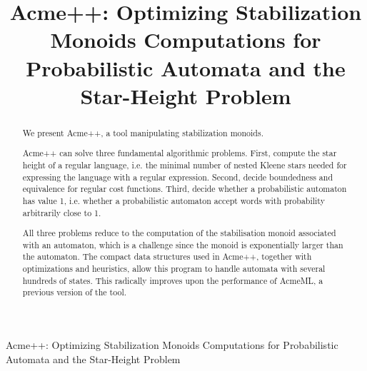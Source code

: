 \documentclass[11pt]{llncs}
\title{Acme++: Optimizing Stabilization Monoids Computations for Probabilistic Automata and the Star-Height Problem}
\begin{document}
\begin{center}
{\large
Acme++: Optimizing Stabilization Monoids Computations for Probabilistic Automata and the Star-Height Problem}
\end{center}

\begin{abstract}
We present Acme++, a tool manipulating stabilization monoids.

Acme++ can solve three fundamental algorithmic problems.  First, compute
the star height of a regular language, i.e. the minimal number of
nested Kleene stars needed for expressing the language with a regular expression. Second, decide boundedness and equivalence for regular cost functions. Third, decide whether a
probabilistic automaton has value 1, i.e. whether a probabilistic
automaton accept words with probability arbitrarily close to 1.

All three problems reduce to the computation of the stabilisation monoid associated with an automaton,
which is a challenge since the monoid is exponentially larger than the automaton.
The compact data structures used in Acme++, together with optimizations and heuristics, allow this program to handle automata with
several hundreds of states. This radically improves upon the performance of AcmeML,
a previous version of the tool.
\end{abstract}















\end{document}
